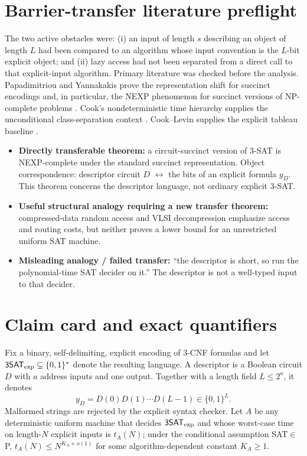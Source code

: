 \documentclass[11pt]{article}
\newcommand{\SAT}{\mathsf{3SAT}_{\rm exp}}
\begin{document}
\section*{Barrier-transfer literature preflight}
The two active obstacles were: (i) an input of length $s$ describing an object
of length $L$ had been compared to an algorithm whose input convention is the
$L$-bit explicit object; and (ii) lazy access had not been separated from a
direct call to that explicit-input algorithm.  Primary literature was checked
before the analysis.  Papadimitriou and Yannakakis prove the representation
shift for succinct encodings and, in particular, the NEXP phenomenon for
succinct versions of NP-complete problems \cite{PY1986}.  Cook's
nondeterministic time hierarchy supplies the unconditional class-separation
context \cite{Cook1973}.  Cook--Levin supplies the explicit tableau baseline
\cite{Cook1971}.

\begin{itemize}
\item \textbf{Directly transferable theorem:} a circuit-succinct version of
3-SAT is NEXP-complete under the standard succinct representation.  Object
correspondence: descriptor circuit $D$ $\leftrightarrow$ the bits of an
explicit formula $y_D$.  This theorem concerns the descriptor language, not
ordinary explicit 3-SAT.
\item \textbf{Useful structural analogy requiring a new transfer theorem:}
compressed-data random access and VLSI decompression emphasize access and
routing costs, but neither proves a lower bound for an unrestricted uniform
SAT machine.
\item \textbf{Misleading analogy / failed transfer:} ``the descriptor is
short, so run the polynomial-time SAT decider on it.''  The descriptor is not a
well-typed input to that decider.
\end{itemize}

\section*{Claim card and exact quantifiers}
Fix a binary, self-delimiting, explicit encoding of 3-CNF formulas and let
$\SAT\subseteq\{0,1\}^*$ denote the resulting language.  A descriptor is a
Boolean circuit $D$ with $a$ address inputs and one output.  Together with a
length field $L\leq 2^a$, it denotes
\[
       y_D=D(0)D(1)\cdots D(L-1)\in\{0,1\}^L.
\]
Malformed strings are rejected by the explicit syntax checker.  Let
$A$ be any deterministic uniform machine that decides $\SAT$ and whose
worst-case time on length-$N$ explicit inputs is $t_A(N)$; under the conditional
assumption SAT$\in$P, $t_A(N)\leq N^{K_A+o(1)}$ for some algorithm-dependent
constant $K_A\geq 1$.
\end{document}

